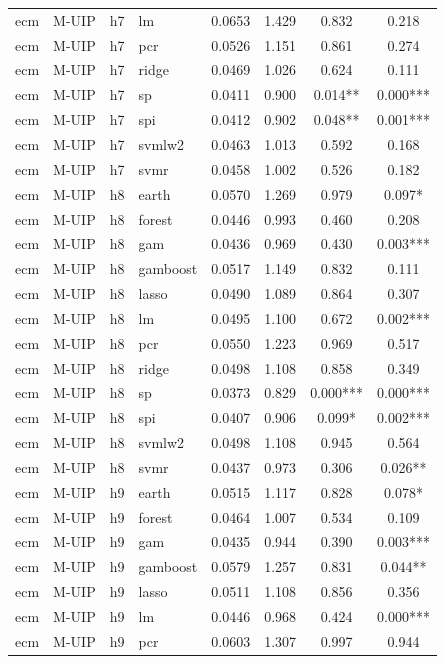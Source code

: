 \begin{ThreePartTable}
\begin{longtable}[t]{llclcccc}
ecm & M-UIP & h7 & lm & 0.0653 & 1.429 & 0.832 & 0.218\\
ecm & M-UIP & h7 & pcr & 0.0526 & 1.151 & 0.861 & 0.274\\
ecm & M-UIP & h7 & ridge & 0.0469 & 1.026 & 0.624 & 0.111\\
ecm & M-UIP & h7 & sp & 0.0411 & 0.900 & 0.014** & 0.000***\\
ecm & M-UIP & h7 & spi & 0.0412 & 0.902 & 0.048** & 0.001***\\
ecm & M-UIP & h7 & svmlw2 & 0.0463 & 1.013 & 0.592 & 0.168\\
ecm & M-UIP & h7 & svmr & 0.0458 & 1.002 & 0.526 & 0.182\\
\addlinespace
ecm & M-UIP & h8 & earth & 0.0570 & 1.269 & 0.979 & 0.097*\\
ecm & M-UIP & h8 & forest & 0.0446 & 0.993 & 0.460 & 0.208\\
ecm & M-UIP & h8 & gam & 0.0436 & 0.969 & 0.430 & 0.003***\\
ecm & M-UIP & h8 & gamboost & 0.0517 & 1.149 & 0.832 & 0.111\\
ecm & M-UIP & h8 & lasso & 0.0490 & 1.089 & 0.864 & 0.307\\
ecm & M-UIP & h8 & lm & 0.0495 & 1.100 & 0.672 & 0.002***\\
ecm & M-UIP & h8 & pcr & 0.0550 & 1.223 & 0.969 & 0.517\\
ecm & M-UIP & h8 & ridge & 0.0498 & 1.108 & 0.858 & 0.349\\
ecm & M-UIP & h8 & sp & 0.0373 & 0.829 & 0.000*** & 0.000***\\
ecm & M-UIP & h8 & spi & 0.0407 & 0.906 & 0.099* & 0.002***\\
ecm & M-UIP & h8 & svmlw2 & 0.0498 & 1.108 & 0.945 & 0.564\\
ecm & M-UIP & h8 & svmr & 0.0437 & 0.973 & 0.306 & 0.026**\\
\addlinespace
ecm & M-UIP & h9 & earth & 0.0515 & 1.117 & 0.828 & 0.078*\\
ecm & M-UIP & h9 & forest & 0.0464 & 1.007 & 0.534 & 0.109\\
ecm & M-UIP & h9 & gam & 0.0435 & 0.944 & 0.390 & 0.003***\\
ecm & M-UIP & h9 & gamboost & 0.0579 & 1.257 & 0.831 & 0.044**\\
ecm & M-UIP & h9 & lasso & 0.0511 & 1.108 & 0.856 & 0.356\\
ecm & M-UIP & h9 & lm & 0.0446 & 0.968 & 0.424 & 0.000***\\
ecm & M-UIP & h9 & pcr & 0.0603 & 1.307 & 0.997 & 0.944\\

\end{longtable}
\end{ThreePartTable}
